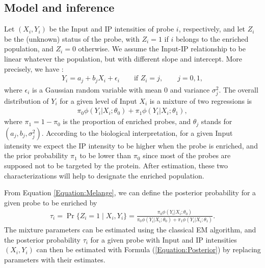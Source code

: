 \documentclass{llncs}
\begin{document}
\subsection{Model and inference}
Let $(X_i,Y_i)$ be the Input and IP intensities of probe $i$,
respectively, and let $Z_i$ be the (unknown) status of the probe,
with $Z_i=1$ if $i$ belongs to the enriched population, and $Z_i=0$
otherwise. We assume the Input-IP relationship to be linear whatever
the population, but with different slope and intercept. More
precisely, we have :
\begin{eqnarray}
Y_i = a_j + b_j X_i + \epsilon_i  \qquad \text{if } Z_i=j,
\qquad j=0,1,
\end{eqnarray}
where $\epsilon_i$ is a Gaussian random variable with mean 0 and
variance $\sigma^2_j$. The overall distribution of $Y_i$ for a
given level of Input $X_i$ is a mixture of two regressions is
\begin{eqnarray}
\pi_0 \phi(Y_i | X_i; \theta_0) + \pi_1 \phi(Y_i | X_i;
\theta_1),\label{Equation:Melange} %
\end{eqnarray}
where $\pi_1 = 1-\pi_0$ is the proportion of enriched probes, and
$\theta_j$ stands for $(a_j, b_j, \sigma^2_j)$.
According to the biological interpretation, for a given Input
intensity we expect the IP intensity to be higher when the probe is
enriched, and the prior probability $\pi_1$ to be lower than $\pi_0$
since most of the probes are supposed not to be targeted by the
protein. After estimation, these two characterizations will help to
designate the enriched population. {\par} From Equation
\ref{Equation:Melange}, we can define the posterior probability for a
given probe to be enriched by
\begin{eqnarray}
\tau_i = \Pr\{Z_i=1 \;|\; X_i,Y_i\} = \frac{\pi_0
  \phi(Y_i |X_i; \theta_0)}{\pi_0 \phi(Y_i|X_i; \theta_0) + \pi_1 \phi(Y_i|X_i;
  \theta_1)}. \label{Equation:Posterior}
\end{eqnarray}
The mixture parameters can be estimated using the classical EM
algorithm, and the posterior probability $\tau_i$ for a given probe
with Input and IP intensities $(X_i,Y_i)$ can then be estimated with
Formula (\ref{Equation:Posterior}) by replacing parameters with their
estimates. {\par}
\end{document}
